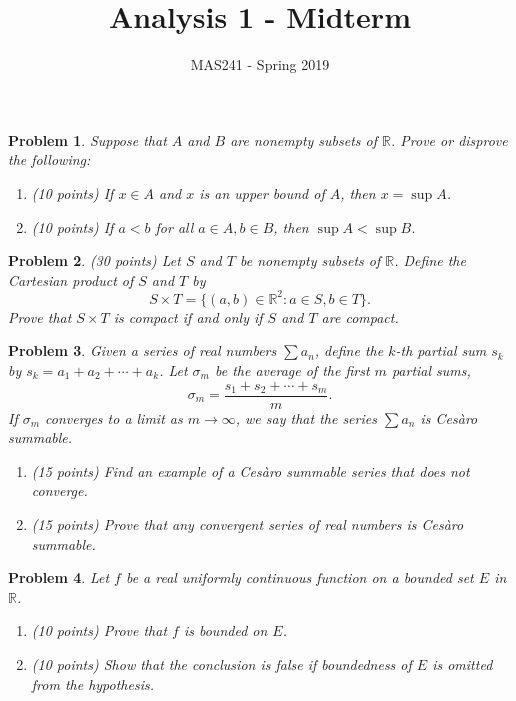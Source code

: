 \documentclass[11pt]{article}
\title{Analysis 1 - Midterm}
\author{MAS241 - Spring 2019}
\date{}
\newtheorem{problem}{Problem}
\begin{document}
	\maketitle
	\begin{problem}
		Suppose that $A$ and $B$ are nonempty subsets of $\mathbb{R}$. Prove or disprove the following:
		\begin{enumerate}
			\item (10 points) If $x \in A$ and $x$ is an upper bound of $A$, then $x = \sup A$.
			\item (10 points) If $a < b$ for all $a \in A, b \in B$, then $\sup A < \sup B$.
		\end{enumerate}
	\end{problem}

	\begin{problem}
		(30 points) Let $S$ and $T$ be nonempty subsets of $\mathbb{R}$. Define the Cartesian product of $S$ and $T$ by $$S \times T = \{ (a, b) \in \mathbb{R}^2 : a \in S, b \in T \}.$$ Prove that $S \times T$ is compact if and only if $S$ and $T$ are compact.
	\end{problem}
	
	\begin{problem}
		Given a series of real numbers $\sum a_n$, define the $k$-th partial sum $s_k$ by $s_k = a_1 + a_2 + \cdots + a_k$. Let $\sigma_m$ be the average of the first $m$ partial sums,
		$$\sigma_m = \frac{s_1 + s_2 + \cdots + s_m}m.$$
		If $\sigma_m$ converges to a limit as $m \to \infty$, we say that the series $\sum a_n$ is Cesàro summable.
		\begin{enumerate}
			\item (15 points) Find an example of a Cesàro summable series that does not converge.
			\item (15 points) Prove that any convergent series of real numbers is Cesàro summable.
		\end{enumerate}
	\end{problem}

	\begin{problem}
		Let $f$ be a real uniformly continuous function on a bounded set $E$ in $\mathbb{R}$.
		\begin{enumerate}
			\item (10 points) Prove that $f$ is bounded on $E$.
			\item (10 points) Show that the conclusion is false if boundedness of $E$ is omitted from the hypothesis.
		\end{enumerate}
	\end{problem}
\end{document}
